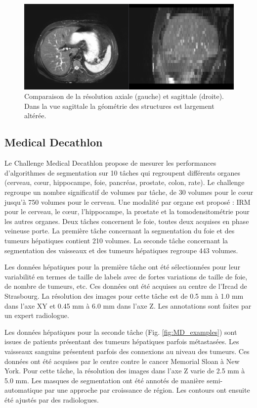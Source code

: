 \begin{figure}
    \centering
    \includegraphics[width=\textwidth]{Images/CHAOS_resolution.png}
    \caption{Comparaison de la résolution axiale (gauche) et sagittale (droite). Dans la vue sagittale la géométrie des structures est largement altérée.}
    \label{fig:CHAOS_geometry}
\end{figure}

\subsection{Medical Decathlon}

Le Challenge Medical Decathlon propose de mesurer les performances d'algorithmes de segmentation sur 10 tâches qui regroupent différents organes (cerveau, cœur, hippocampe, foie, pancréas, prostate, colon, rate). Le challenge regroupe un nombre significatif de volumes par tâche, de 30 volumes pour le cœur jusqu'à 750 volumes pour le cerveau. Une modalité par organe est proposé : IRM pour le cerveau, le cœur, l'hippocampe, la prostate et la tomodensitométrie pour les autres organes. Deux tâches concernent le foie, toutes deux acquises en phase veineuse porte. La première tâche concernant la segmentation du foie et des tumeurs hépatiques contient 210 volumes. La seconde tâche concernant la segmentation des vaisseaux et des tumeurs hépatiques regroupe 443 volumes.

Les données hépatiques pour la première tâche ont été sélectionnées pour leur variabilité en termes de taille de labels avec de fortes variations de taille de foie, de nombre de tumeurs, etc. Ces données ont été acquises au centre de l'Ircad de Strasbourg. La résolution des images pour cette tâche est de 0.5 mm à 1.0 mm dans l'axe XY et 0.45 mm à 6.0 mm dans l'axe Z. Les annotations sont faites par un expert radiologue.

Les données hépatiques pour la seconde tâche (Fig. \ref{fig:MD_examples}) sont issues de patients présentant des tumeurs hépatiques parfois métastasées. Les vaisseaux sanguins présentent parfois des connexions au niveau des tumeurs. Ces données ont été acquises par le centre contre le cancer Memorial Sloan à New York. Pour cette tâche, la résolution des images dans l'axe Z varie de 2.5 mm à 5.0 mm. Les masques de segmentation ont été annotés de manière semi-automatique par une approche par croissance de région. Les contours ont ensuite été ajustés par des radiologues.

